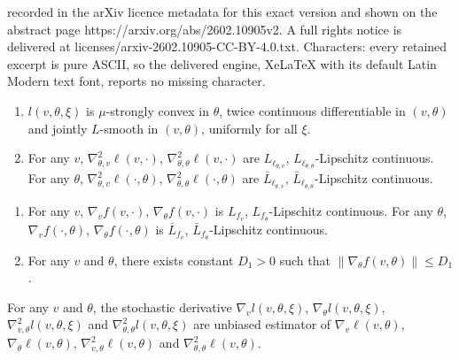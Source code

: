 \documentclass[10pt,a4paper]{amsart}
\begin{document}
recorded in the arXiv licence metadata for this exact version and shown on the abstract page https://arxiv.org/abs/2602.10905v2. A full rights notice is delivered at licenses/arxiv-2602.10905-CC-BY-4.0.txt. Characters: every retained excerpt is pure ASCII, so the delivered engine, XeLaTeX with its default Latin Modern text font, reports no missing character.
\begin{assumption}\label{as:l_inner} 
\begin{enumerate}[label=(\roman*)]
\item  $ l(v,\theta,\xi)$ is $\mu$-strongly convex in $\theta$, twice continuous differentiable in $(v,\theta)$ and jointly $L$-smooth in $(v,\theta)$, uniformly for all $\xi$.

\item  For any $v$,  $\nabla^2_{\theta,v}\ell(v,\cdot)$,  $\nabla^2_{\theta,\theta}\ell(v,\cdot)$ are  $L_{\ell_{\theta,v}}$, $L_{\ell_{\theta,\theta}}$-Lipschitz continuous. For any $\theta$,  $\nabla^2_{\theta,v}\ell(\cdot,\theta)$, $\nabla^2_{\theta,\theta}\ell(\cdot,\theta)$ are $\bar{L}_{\ell_{\theta,v}}$, $\bar{L}_{\ell_{\theta,\theta}}$-Lipschitz continuous.    
\end{enumerate}
\end{assumption}

\begin{assumption}\label{as:f_smoothness}

\begin{enumerate}[label=(\roman*)]
    \item  For any $v$, $\nabla_v f(v,\cdot)$, $\nabla_\theta f(v,\cdot)$ is $L_{f_v}$, $L_{f_\theta}$-Lipschitz continuous. For any $\theta$, $\nabla_v f(\cdot,\theta)$, $\nabla_\theta f(\cdot,\theta)$ is $\bar{L}_{f_v}$, $\bar{L}_{f_\theta}$-Lipschitz continuous.
    \item For any $v$ and $\theta$, there exists constant $D_1>0$ such that $\| \nabla_\theta f(v,\theta) \|\leq D_1$.
\end{enumerate}
\end{assumption}

\begin{assumption}\label{as:unbias_grad}

    For any $v$ and $\theta$, the stochastic derivative $\nabla_vl(v,\theta,\xi)$, $\nabla_\theta l(v,\theta,\xi)$, $\nabla_{v,\theta}^2l(v,\theta,\xi)$ and $\nabla_{\theta,\theta}^2l(v,\theta,\xi)$ are unbiased estimator of $\nabla_v\ell(v,\theta)$, $\nabla_\theta\ell(v,\theta)$, $\nabla_{v,\theta}^2\ell(v,\theta)$ and $\nabla_{\theta,\theta}^2\ell(v,\theta)$.
\end{assumption}
\end{document}

